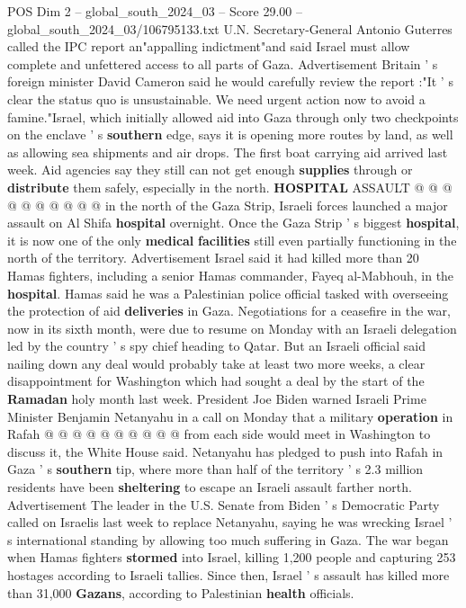 \begin{textsample}{POS Dim 2 – global\_south\_2024\_03 – Score 29.00 – global\_south\_2024\_03/106795133.txt}
U.N.
Secretary-General Antonio Guterres called the IPC report an"appalling indictment"and said Israel must allow complete and unfettered access to all parts of Gaza.
Advertisement Britain ' s foreign minister David Cameron said he would carefully review the report :"It ' s clear the status quo is unsustainable.
We need urgent action now to avoid a famine."Israel, which initially allowed aid into Gaza through only two checkpoints on the enclave ' s \textbf{southern} edge, says it is opening more routes by land, as well as allowing sea shipments and air drops.
The first boat carrying aid arrived last week.
Aid agencies say they still can not get enough \textbf{supplies} through or \textbf{distribute} them safely, especially in the north. \textbf{HOSPITAL} ASSAULT @ @ @ @ @ @ @ @ @ @ in the north of the Gaza Strip, Israeli forces launched a major assault on Al Shifa \textbf{hospital} overnight.
Once the Gaza Strip ' s biggest \textbf{hospital}, it is now one of the only \textbf{medical} \textbf{facilities} still even partially functioning in the north of the territory.
Advertisement Israel said it had killed more than 20 Hamas fighters, including a senior Hamas commander, Fayeq al-Mabhouh, in the \textbf{hospital}.
Hamas said he was a Palestinian police official tasked with overseeing the protection of aid \textbf{deliveries} in Gaza.
Negotiations for a ceasefire in the war, now in its sixth month, were due to resume on Monday with an Israeli delegation led by the country ' s spy chief heading to Qatar.
But an Israeli official said nailing down any deal would probably take at least two more weeks, a clear disappointment for Washington which had sought a deal by the start of the \textbf{Ramadan} holy month last week.
President Joe Biden warned Israeli Prime Minister Benjamin Netanyahu in a call on Monday that a military \textbf{operation} in Rafah @ @ @ @ @ @ @ @ @ @ from each side would meet in Washington to discuss it, the White House said.
Netanyahu has pledged to push into Rafah in Gaza ' s \textbf{southern} tip, where more than half of the territory ' s 2.3 million residents have been \textbf{sheltering} to escape an Israeli assault farther north.
Advertisement The leader in the U.S.
Senate from Biden ' s Democratic Party called on Israelis last week to replace Netanyahu, saying he was wrecking Israel ' s international standing by allowing too much suffering in Gaza.
The war began when Hamas fighters \textbf{stormed} into Israel, killing 1,200 people and capturing 253 hostages according to Israeli tallies.
Since then, Israel ' s assault has killed more than 31,000 \textbf{Gazans}, according to Palestinian \textbf{health} officials.

\end{textsample}

